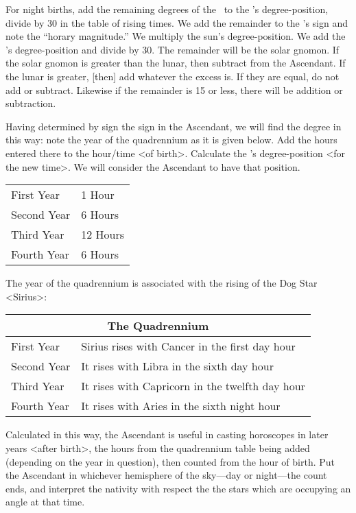 For night births, add the remaining degrees of the \Moon\, to the \Sun’s degree-position, divide by 30 in the table of rising times. We add the remainder to the \Sun’s sign and note the “horary magnitude.” We multiply the sun’s degree-position. We add the \Sun’s degree-position and divide by 30. The remainder will be the solar gnomon. If the solar gnomon is greater than the lunar, then subtract from the Ascendant.
If the lunar is greater, [then] add whatever the excess is. If they are equal, do not add or subtract. Likewise if the remainder is 15 or less, there will be addition or subtraction.

Having determined by sign the sign in the Ascendant, we will find the degree in this way: note the year of the quadrennium as it is given below. Add the hours entered there to the hour/time <of birth>. Calculate the \Moon’s degree-position <for the new time>. We will consider the Ascendant to have that position.

\renewcommand{\arraystretch}{1.2}
\begin{table}[h!]
\begin{center}
\begin{tabular}{| p{.3\linewidth} | p{.3\linewidth} |}
\hline
First Year & 1 Hour \\
Second Year & 6 Hours \\
Third Year & 12 Hours \\
Fourth Year & 6 Hours \\
\hline
\end{tabular}
\end{center}
\end{table}

The year of the quadrennium is associated with the rising of the Dog Star <Sirius>:

\begin{table}
\begin{center}
\begin{tabularx}{\textwidth}	{| l | X |}
\hline
\multicolumn{2}{|c|}{The Quadrennium} \\
\hline
First Year
	& Sirius rises with Cancer in the first day hour \\
Second Year 
	& It rises with Libra in the sixth day hour \\
Third Year 
	& It rises with Capricorn in the twelfth day hour \\
Fourth Year 
	& It rises with Aries in the sixth night hour \\
\hline	
\end{tabularx}
\end{center}
\end{table}
\mnt[0.2cm]
Calculated in this way, the Ascendant is useful in casting horoscopes in later years <after birth>, the hours from the quadrennium table being added (depending on the year in question), then counted from the hour of birth. Put the Ascendant in whichever hemisphere of the sky—day or night—the count ends, and interpret the nativity with respect the the stars which are occupying an angle at that time.

\newpage